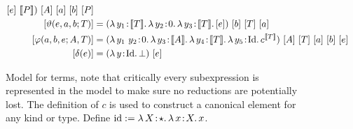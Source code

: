 \begin{figure}
\begin{align*}
{{{                        [e]\ \sema{P}
                    }
                }
            })\ [A]\ [a]\ [b]\ [P] \\
        [\vartheta(e, a, b; T)] &= (\abs{\lambda}{y_1}{\sema{T}}{
            \abs{\lambda}{y_2}{0} {
                \abs{\lambda}{y_3}{\sema{T}}{
                    [e]
                }
            }
        })\ [b]\ [T]\ [a] \\
        [\varphi(a, b, e; A, T)] &= (\abs{\lambda}{y_1\ y_2}{0}{
            \abs{\lambda}{y_3}{\sema{A}}{
                \abs{\lambda}{y_4}{\sema{T}}{
                    \abs{\lambda}{y_5}{\fpId}{
                        c^{\sema{T}}
                    }
                }
            }
        })\ [A]\ [T]\ [a]\ [b]\ [e] \\
        [\delta(e)] &= (\abs{\lambda}{y}{\fpId}{
            \bot
        })\ [e]
    \end{align*}
    \caption{
        Model for terms, note that critically every subexpression is represented in the model to make sure no reductions are potentially lost.
        The definition of $c$ is used to construct a canonical element for any kind or type.
        Define $\text{id} := {\lambda}\, X\! : \! \star.\, 
            {\lambda}\, x\! : \! X.\, x
       $.
    }
    \label{fig:3:model_terms}
\end{figure}

